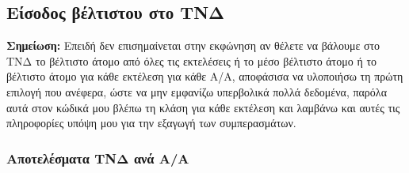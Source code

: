 \documentclass[12pt,a4paper]{article}
\begin{document}
\subsection{Είσοδος βέλτιστου στο ΤΝΔ}

\textbf{Σημείωση:} Επειδή δεν επισημαίνεται στην εκφώνηση αν θέλετε να βάλουμε στο ΤΝΔ το βέλτιστο άτομο από όλες τις εκτελέσεις ή το μέσο βέλτιστο άτομο ή το βέλτιστο άτομο για κάθε εκτέλεση για κάθε Α/Α, αποφάσισα να υλοποιήσω τη πρώτη επιλογή που ανέφερα, ώστε να μην εμφανίζω υπερβολικά πολλά δεδομένα, παρόλα αυτά στον κώδικά μου βλέπω τη κλάση για κάθε εκτέλεση και λαμβάνω και αυτές τις πληροφορίες υπόψη μου για την εξαγωγή των συμπερασμάτων.

\subsubsection{Αποτελέσματα ΤΝΔ ανά Α/Α}
\end{document}
